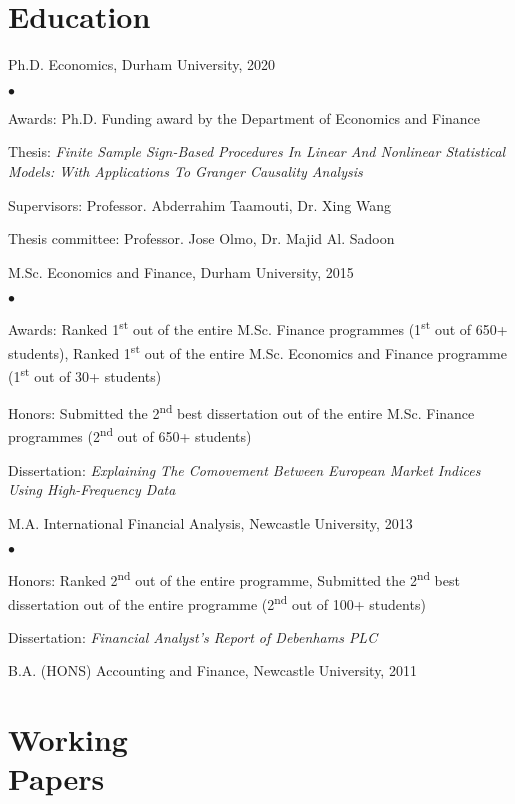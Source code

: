 \documentclass[margin,line,pifont,palatino,courier]{res}
\newcommand{\ts}{\textsuperscript}
\newenvironment{list2}{
  \begin{list}{$\bullet$}{%
      \setlength{\itemsep}{0in}
      \setlength{\parsep}{0in} \setlength{\parskip}{0in}
      \setlength{\topsep}{0in} \setlength{\partopsep}{0in}
      \setlength{\leftmargin}{0.2in}}}{\end{list}}
\begin{document}
\begin{resume}
\section{\sc \bf Education}

Ph.D. Economics, Durham University, 2020
\vspace*{+4ex}
\begin{list2}
\item Awards: Ph.D. Funding award by the Department of Economics and Finance
\item Thesis: \emph{Finite Sample Sign-Based Procedures In Linear And Nonlinear Statistical Models: With Applications To Granger Causality Analysis}
\item Supervisors: Professor. Abderrahim Taamouti, Dr. Xing Wang
\item Thesis committee: Professor. Jose Olmo, Dr. Majid Al. Sadoon
\end{list2}

M.Sc. Economics and Finance, Durham University, 2015
\vspace*{+4ex}
\begin{list2}
\item Awards: Ranked 1\ts{st} out of the entire M.Sc. Finance programmes (1\ts{st} out of 650+ students), Ranked 1\ts{st} out of the entire M.Sc. Economics and Finance programme (1\ts{st} out of 30+ students)
\item Honors: Submitted the 2\ts{nd} best dissertation out of the entire M.Sc. Finance programmes (2\ts{nd} out of 650+ students)
\item Dissertation:  \emph{Explaining The Comovement Between European Market Indices Using High-Frequency Data}
\end{list2}

M.A. International Financial Analysis, Newcastle University, 2013
\vspace*{+4ex}
\begin{list2}
\item Honors: Ranked 2\ts{nd} out of the entire programme, Submitted the 2\ts{nd} best dissertation out of the entire programme (2\ts{nd} out of 100+ students)
\item Dissertation:  \emph{Financial Analyst's Report of Debenhams PLC}
\end{list2}
B.A. (HONS) Accounting and Finance, Newcastle University, 2011

\hrulefill

\section{\sc \bf Working \\
Papers}


\end{resume}
\end{document}
